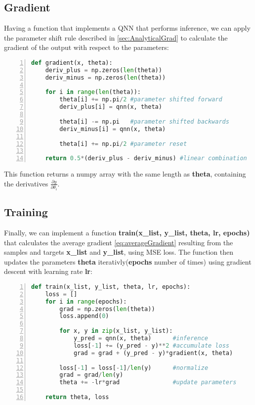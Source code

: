 \subsection{Gradient}\label{sec:GradientImplementation}
Having a function that implements a QNN that performs inference, we can apply the parameter shift rule described in \autoref{sec:AnalyticalGrad} to calculate the gradient of the output with respect to the parameters:

\begin{lstlisting}[language=python, numbers=left]
def gradient(x, theta):
    deriv_plus = np.zeros(len(theta))
    deriv_minus = np.zeros(len(theta))
    
    for i in range(len(theta)):
        theta[i] += np.pi/2 #parameter shifted forward
        deriv_plus[i] = qnn(x, theta) 
        
        theta[i] -= np.pi   #parameter shifted backwards
        deriv_minus[i] = qnn(x, theta)
        
        theta[i] += np.pi/2 #parameter reset
    
    return 0.5*(deriv_plus - deriv_minus) #linear combination
\end{lstlisting}
This function returns a numpy array with the same length as \textbf{theta}, containing the derivatives $\frac{\partial y}{\partial \theta_i}$.

\subsection{Training}\label{sec:QNNTraining}

Finally, we can implement a function \textbf{train(x\_list, y\_list, theta, lr, epochs)} that calculates the average gradient \autoref{eq:averageGradient} resulting from the samples and targets \textbf{x\_list} and \textbf{y\_list}, using MSE loss. The function then updates the parameters \textbf{theta} iterativly(\textbf{epochs} number of times) using gradient descent with learning rate \textbf{lr}:

\begin{lstlisting}[language=python, numbers=left]
def train(x_list, y_list, theta, lr, epochs):
    loss = []
    for i in range(epochs):
        grad = np.zeros(len(theta))
        loss.append(0)
        
        for x, y in zip(x_list, y_list):
            y_pred = qnn(x, theta)      #inference
            loss[-1] += (y_pred - y)**2 #accumulate loss        
            grad = grad + (y_pred - y)*gradient(x, theta)
        
        loss[-1] = loss[-1]/len(y)      #normalize
        grad = grad/len(y)
        theta += -lr*grad               #update parameters
    
    return theta, loss
\end{lstlisting}

